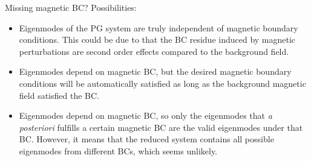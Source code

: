 \documentclass[11pt,aspectratio=169]{beamer}
\begin{document}
\begin{frame}{Missing magnetic BC?}
	Possibilities:
	\begin{itemize}
		\item Eigenmodes of the PG system are truly independent of magnetic boundary conditions. This could be due to that the BC residue induced by magnetic perturbations are second order effects compared to the background field.
		\item Eigenmodes depend on magnetic BC, but the desired magnetic boundary conditions will be automatically satisfied as long as the background magnetic field satisfied the BC.
		\item Eigenmodes depend on magnetic BC, so only the eigenmodes that \textit{a posteriori} fulfills a certain magnetic BC are the valid eigenmodes under that BC. However, it means that the reduced system contains all possible eigenmodes from different BCs, which seems unlikely.
	\end{itemize}
\end{frame}
\end{document}

